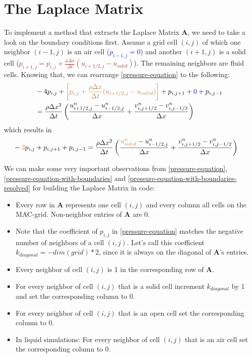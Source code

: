 \newpage

\section{ The Laplace Matrix }
To implement a method that extracts the Laplace Matrix \textbf{A}, we need to take a look on the boundary conditions first. Assume a grid cell $(i,j)$ of which one neighbor $(i-1,j)$ is an air cell (\textcolor{blue}{$p_{i-1,j}=0$}) and another $(i+1, j)$ is a solid cell (\textcolor{brown}{$p_{i+1,j}= p_{i,j} + \frac{\rho \Delta x}{\Delta t} (u_{i+1/2,j} - u_{solid})$}). The remaining neighbors are fluid cells. Knowing that, we can rearrange \ref{pressure-equation} to the following:
\begin{equation} \label{pressure-equation-with-boundaries}
    \begin{aligned}
        & -4p_{i,j} + \textcolor{brown}{\left[p_{i,j} + \frac{\rho \Delta x}{\Delta t} (u_{i+1/2,j} - u_{solid}) \right]} + p_{i,j+1} + \textcolor{blue}{0} + p_{i,j-1} \\
        & = \frac{\rho \Delta x^2}{\Delta t} \left( \frac{u_{i+1/2,j}^{n} - u_{i-1/2,j}^{n}}{\Delta x} + \frac{v_{i,j+1/2}^{n} - v_{i,j-1/2}^{n}}{\Delta x} \right)
    \end{aligned}
\end{equation}
which results in
\begin{equation} \label{pressure-equation-with-boundaries-resolved}
    \begin{aligned}
        & - \textcolor{brown}{3}p_{i,j} + p_{i,j+1} + p_{i,j-1} = \frac{\rho \Delta x^2}{\Delta t} \left( \frac{\textcolor{brown}{u_{solid}^{n}} - u_{i-1/2,j}^{n}}{\Delta x} + \frac{v_{i,j+1/2}^{n} - v_{i,j-1/2}^{n}}{\Delta x} \right)
    \end{aligned}
\end{equation}
\par We can make some very important observations from \ref{pressure-equation}, \ref{pressure-equation-with-boundaries} and \ref{pressure-equation-with-boundaries-resolved} for building the Laplace Matrix in code:
\begin{itemize}
      \item Every row in \textbf{A} represents one cell $(i,j)$ and every column all cells on the MAC-grid. Non-neighbor entries of $\mathbf{A}$ are 0.
      \item Note that the coefficient of $p_{i,j}$ in \ref{pressure-equation} matches the negative number of neighbors of a cell $(i,j)$. Let's call this coefficient $k_{diagonal} = -dim(grid) * 2$, since it is always on the diagonal of $\mathbf{A}$'s entries.
      \item Every neighbor of cell $(i,j)$ is 1 in the corresponding row of $\mathbf{A}$.
      \item For every neighbor of cell $(i,j)$ that is a solid cell increment $k_{diagonal}$ by 1 and set the corresponding column to 0.
      \item For every neighbor of cell $(i,j)$ that is an open cell set the corresponding column to 0.
      \item In liquid simulations: For every neighbor of cell $(i,j)$ that is an air cell set the corresponding column to 0.
\end{itemize}
